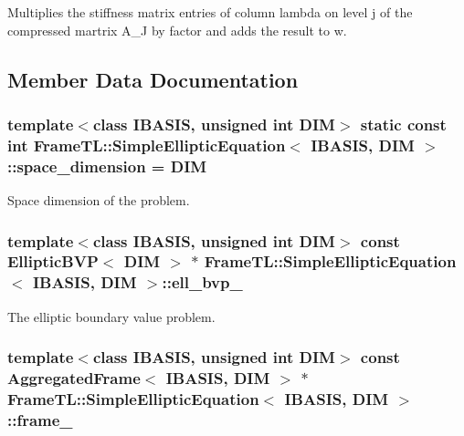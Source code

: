 Multiplies the stiffness matrix entries of column lambda on level j of the compressed martrix A\_\-J by factor and adds the result to w. 

\subsection{Member Data Documentation}
\hypertarget{classFrameTL_1_1SimpleEllipticEquation_b3b9b916f42e8cf03bda2a6230141e79}{
\subsubsection[space\_\-dimension]{\setlength{\rightskip}{0pt plus 5cm}template$<$class IBASIS, unsigned int DIM$>$ static const int {\bf FrameTL::SimpleEllipticEquation}$<$ IBASIS, DIM $>$::{\bf space\_\-dimension} = DIM}}
\label{classFrameTL_1_1SimpleEllipticEquation_b3b9b916f42e8cf03bda2a6230141e79}


Space dimension of the problem. \hypertarget{classFrameTL_1_1SimpleEllipticEquation_8070f6b619aac2cb61020481df7b09a8}{
\subsubsection[ell\_\-bvp\_\-]{\setlength{\rightskip}{0pt plus 5cm}template$<$class IBASIS, unsigned int DIM$>$ const EllipticBVP$<$ DIM $>$ $\ast$ {\bf FrameTL::SimpleEllipticEquation}$<$ IBASIS, DIM $>$::{\bf ell\_\-bvp\_\-}}}
\label{classFrameTL_1_1SimpleEllipticEquation_8070f6b619aac2cb61020481df7b09a8}


The elliptic boundary value problem. \hypertarget{classFrameTL_1_1SimpleEllipticEquation_8cd2f036aa5557d584d8be5acf80e958}{
\subsubsection[frame\_\-]{\setlength{\rightskip}{0pt plus 5cm}template$<$class IBASIS, unsigned int DIM$>$ const {\bf AggregatedFrame}$<$ IBASIS, DIM $>$ $\ast$ {\bf FrameTL::SimpleEllipticEquation}$<$ IBASIS, DIM $>$::{\bf frame\_\-}}}
\label{classFrameTL_1_1SimpleEllipticEquation_8cd2f036aa5557d584d8be5acf80e958}


